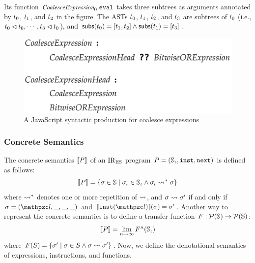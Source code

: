 \noindent Its  function $\textit{\small CoalesceExpression}_0.\texttt{eval}$
takes three subtrees as arguments annotated by $t_0$, $t_1$, and
$t_2$ in the figure. The ASTs $t_0$, $t_1$, $t_2$, and $t_3$
are subtrees of $t_0$ (i.e., $t_0 \lhd t_0, \cdots, t_3
\lhd t_0$), and $\textsf{subs}(t_0) = [t_1, t_2] \wedge
\textsf{subs}(t_1) = [t_3]$.


\begin{figure}
  \centering
  \includegraphics[width=.8\columnwidth]{img/coalesce-prod.png}
  \caption{A JavaScript syntactic production for coalesce expressions}
  \label{fig:coalesce-prod}
\end{figure}




\subsubsection{Concrete Semantics}

The concrete semantics $\llbracket{P}\rrbracket$ of an $\text{IR}_\text{ES}$ program $P = (\mathbb{S}_\iota,
\texttt{inst}, \texttt{next})$ is defined as follows:
\[
  \llbracket{P}\rrbracket = \{ \sigma \in \mathbb{S} \mid \sigma_\iota \in \mathbb{S}_\iota \wedge \sigma_\iota \leadsto^* \sigma \}
\]
where $\leadsto^*$ denotes one or more repetition of $\leadsto$, and $\sigma \leadsto
\sigma'$ if and only if $\st = (\lab, \_, \_, \_)$ and $\sem{\getinst(\lab)}(\st) =
\st'$. Another way to represent the concrete semantics is to define a transfer
function $F: \mathcal{P}(\mathbb{S}) \rightarrow \mathcal{P}(\mathbb{S})$:
\[
  \llbracket{P}\rrbracket = \lim_{n \rightarrow \infty}F^n(\mathbb{S}_\iota)
\]
where $F(S) = \{ \sigma' \mid \sigma \in S \wedge \sigma \leadsto \sigma' \}$.  Now,
we define the denotational semantics of expressions, instructions, and
functions.

